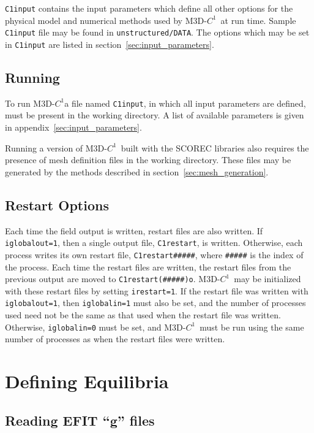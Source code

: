 \documentclass[letterpaper]{book}
\newcommand{\codename}{\textsc{M3D-$C^1$}}
\begin{document}
\texttt{C1input} contains the input parameters which define all other
options for the physical model and numerical methods used by
\codename\ at run time.  Sample \texttt{C1input} file may be found in
\texttt{unstructured/DATA}.  The options which may be set in
\texttt{C1input} are listed in section~\ref{sec:input_parameters}.


\section{Running}

To run \codename a file named \texttt{C1input}, in which all input
parameters are defined, must be present in the working directory.  A
list of available parameters is given in
appendix~\ref{sec:input_parameters}.

Running a version of \codename\ built with the SCOREC libraries also
requires the presence of mesh definition files in the working
directory.  These files may be generated by the methods described in
section~\ref{sec:mesh_generation}.


\section{Restart Options}

Each time the field output is written, restart files are also written.
If \texttt{iglobalout=1}, then a single output file,
\texttt{C1restart}, is written.  Otherwise, each process writes its
own restart file, \texttt{C1restart\#\#\#\#\#}, where
\texttt{\#\#\#\#\#} is the index of the process.  Each time the
restart files are written, the restart files from the previous output
are moved to \texttt{C1restart(\#\#\#\#\#)o}.  \codename\ may be
initialized with these restart files by setting \texttt{irestart=1}.
If the restart file was written with \texttt{iglobalout=1}, then
\texttt{iglobalin=1} must also be set, and the number of processes
used need not be the same as that used when the restart file was
written.  Otherwise, \texttt{iglobalin=0} must be set, and
\codename\ must be run using the same number of processes as when the
restart files were written.



\chapter{Defining Equilibria}

\section{Reading EFIT ``g'' files}
\end{document}
